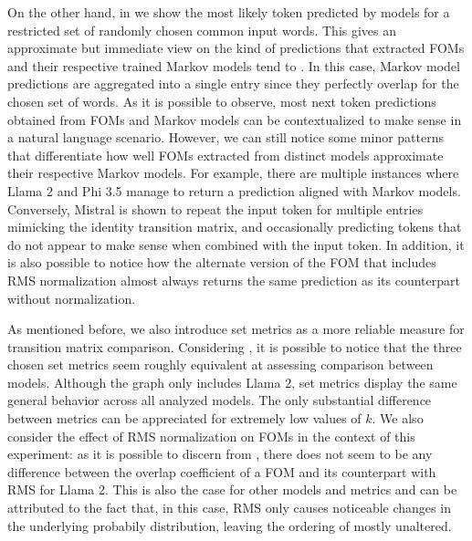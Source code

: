 On the other hand, in  we show the most likely token predicted by models for a restricted set of randomly chosen common input words.
This gives an approximate but immediate view on the kind of predictions that extracted FOMs and their respective trained Markov models tend to .
In this case, Markov model predictions are aggregated into a single entry since they perfectly overlap for the chosen set of words.
As it is possible to observe, most next token predictions obtained from FOMs and Markov models can be contextualized to make sense in a natural language scenario.
However, we can still notice some minor patterns that differentiate how well FOMs extracted from distinct models approximate their respective Markov models.
For example, there are multiple instances where Llama 2 and Phi 3.5 manage to return a prediction aligned with Markov models.
Conversely, Mistral is shown to repeat the input token for multiple entries mimicking the identity transition matrix, and occasionally predicting tokens that do not appear to make sense when combined with the input token.
In addition, it is also possible to notice how the alternate version of the FOM that includes RMS normalization almost always returns the same prediction as its counterpart without normalization.


As mentioned before, we also introduce set metrics as a more reliable measure for transition matrix comparison.
Considering , it is possible to notice that the three chosen set metrics seem roughly equivalent at assessing comparison between models.
Although the graph only includes Llama 2, set metrics display the same general behavior across all analyzed models.
The only substantial difference between metrics can be appreciated for extremely low values of $k$.
We also consider the effect of RMS normalization on FOMs in the context of this experiment: as it is possible to discern from , there does not seem to be any  difference between the overlap coefficient of a FOM and its counterpart with RMS for Llama 2.
This is also the case for other models and metrics and can be attributed to the fact that, in this case, RMS only causes noticeable changes in the underlying probabily distribution, leaving the ordering of  mostly unaltered.


